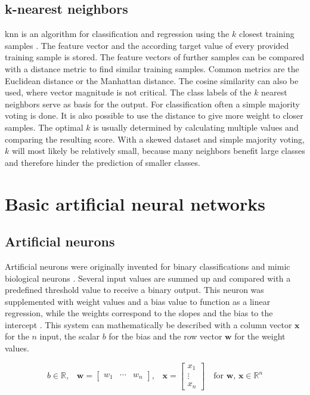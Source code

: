 \subsection{k-nearest neighbors}
\gls{knn} is an algorithm for classification and regression using the $k$ closest training samples \autocite{fix1989,cover1967}. The feature vector and the according target value of every provided training sample is stored. The feature vectors of further samples can be compared with a distance metric to find similar training samples. Common metrics are the Euclidean distance or the Manhattan distance. The cosine similarity can also be used, where vector magnitude is not critical. 
The class labels of the $k$ nearest neighbors serve as basis for the output. For classification often a simple majority voting is done. It is also possible to use the distance to give more weight to closer samples.
The optimal $k$ is usually determined by calculating multiple values and comparing the resulting score. With a skewed dataset and simple majority voting, $k$ will most likely be relatively small, because many neighbors benefit large classes and therefore hinder the prediction of smaller classes.

\section{Basic artificial neural networks}
\subsection{Artificial neurons}
Artificial neurons were originally invented for binary classifications and mimic biological neurons \autocite{mcculloch1943}. Several input values are summed up and compared with a predefined threshold value to receive a binary output. This neuron was supplemented with weight values and a bias value to function as a linear regression, while the weights correspond to the slopes and the bias to the intercept  \autocite{rosenblatt1957}. This system can mathematically be described with a column vector $\mathbf{x}$ for the $n$ input, the scalar $b$ for the bias and the row vector $\mathbf{w}$ for the weight values.

\begin{equation}
    \text{$b \in \mathbb{R}$,}\quad\mathbf{w} = \begin{bmatrix}w_1&\cdots &w_n\end{bmatrix}\text{,}\quad\mathbf{x} = \begin{bmatrix}x_1\\\vdots \\x_n\end{bmatrix}\quad\text{for $\mathbf{w}$, $\mathbf{x} \in \mathbb{R}^n$}
\end{equation}

